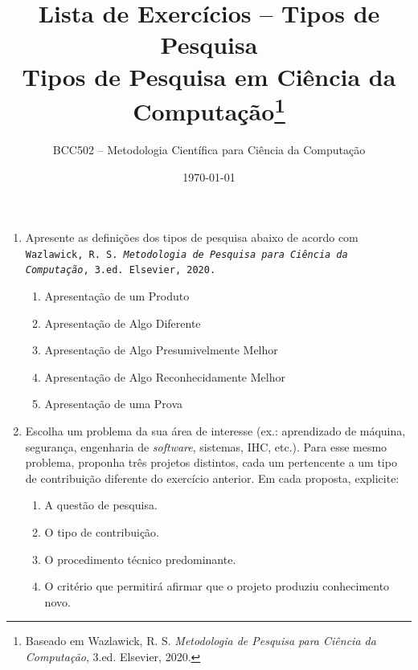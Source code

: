 \documentclass[10pt,a4paper]{extarticle}
\title{Lista de Exercícios -- Tipos de Pesquisa\\
\large Tipos de Pesquisa em Ciência da Computação\footnote{Baseado em Wazlawick, R. S. \textit{Metodologia de Pesquisa para Ciência da Computação}, 3.ed. Elsevier, 2020.}}
\author{BCC502 -- Metodologia Científica para Ciência da Computação}
\date{\today}
\begin{document}
\maketitle


\begin{enumerate}[label=\textbf{\arabic*.}]

\item Apresente  as definições dos tipos de pesquisa abaixo de acordo com \texttt{Wazlawick, R. S. \textit{Metodologia de Pesquisa para Ciência da Computação}, 3.ed. Elsevier, 2020.} 
    
\begin{enumerate}[label=(\alph*)]
    \item Apresentação de um Produto
    \item Apresentação de Algo Diferente
    \item Apresentação de Algo Presumivelmente Melhor 
    \item Apresentação de Algo Reconhecidamente Melhor
    \item Apresentação de uma Prova
\end{enumerate}

  \item  Escolha um problema da sua área de interesse (ex.: aprendizado de máquina, segurança, engenharia de \textit{software}, sistemas, IHC, etc.). Para esse mesmo problema, proponha três projetos distintos, cada um pertencente a um tipo de contribuição diferente do exercício anterior. Em cada proposta, explicite:
  \begin{enumerate}[label=(\alph*)]
    \item A questão de pesquisa.
    \item O tipo de contribuição.
    \item O procedimento técnico predominante.
    \item O critério que permitirá afirmar que o projeto produziu conhecimento novo.
  \end{enumerate}
\end{enumerate}
\end{document}
